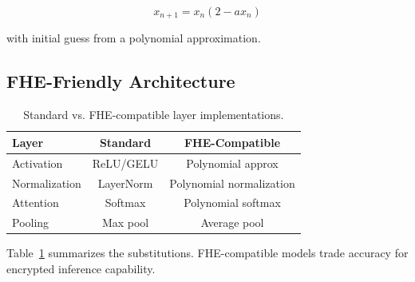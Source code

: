 \begin{equation}
    x_{n+1} = x_n(2 - ax_n)
\end{equation}

with initial guess from a polynomial approximation.

\subsection{FHE-Friendly Architecture}

\begin{table}[h]
\centering
\caption{Standard vs. FHE-compatible layer implementations.}
\label{tab:fhe}
\begin{tabular}{lcc}
\toprule
\textbf{Layer} & \textbf{Standard} & \textbf{FHE-Compatible} \\
\midrule
Activation & ReLU/GELU & Polynomial approx \\
Normalization & LayerNorm & Polynomial normalization \\
Attention & Softmax & Polynomial softmax \\
Pooling & Max pool & Average pool \\
\bottomrule
\end{tabular}
\end{table}

Table~\ref{tab:fhe} summarizes the substitutions. FHE-compatible models trade accuracy for encrypted inference capability.

